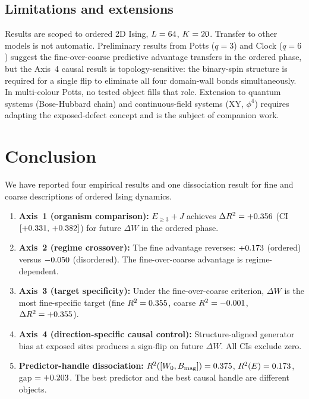 \documentclass[11pt,a4paper]{article}
\begin{document}
\subsection{Limitations and extensions}

Results are scoped to ordered 2D Ising, $L=64$, $K=20$.
Transfer to other models is not automatic.
Preliminary results from Potts ($q=3$) and Clock ($q=6$) suggest the
fine-over-coarse predictive advantage transfers in the ordered phase, but
the Axis~4 causal result is topology-sensitive: the binary-spin structure is required for
a single flip to eliminate all four domain-wall bonds simultaneously.
In multi-colour Potts, no tested object fills that role.
Extension to quantum systems (Bose-Hubbard chain) and continuous-field
systems (XY, $\phi^4$) requires adapting the exposed-defect concept and
is the subject of companion work.

\section{Conclusion}
\label{sec:conclusion}

We have reported four empirical results and one dissociation result
for fine and coarse descriptions of ordered Ising dynamics.

\begin{enumerate}
\item \textbf{Axis~1 (organism comparison):}
$E_{\geq 3}+J$ achieves $\Delta R^2 = +0.356$
(CI $[+0.331,\,+0.382]$) for future $\Delta W$ in the
ordered phase.

\item \textbf{Axis~2 (regime crossover):}
The fine advantage reverses: $+0.173$ (ordered) versus
$-0.050$ (disordered).
The fine-over-coarse advantage is regime-dependent.

\item \textbf{Axis~3 (target specificity):}
Under the fine-over-coarse criterion, $\Delta W$ is the most
fine-specific target
(fine $R^2 = 0.355$, coarse $R^2 = -0.001$,
$\Delta R^2 = +0.355$).

\item \textbf{Axis~4 (direction-specific causal control):}
Structure-aligned generator bias at exposed sites produces a \AxisBSignFlips{}
sign-flip on future $\Delta W$.
All CIs exclude zero.

\item \textbf{Predictor-handle dissociation:}
$R^2([W_0, B_\mathrm{mag}]) = 0.375$,
$R^2(E) = 0.173$,
gap $= +0.203$.
The best predictor and the best causal handle are different objects.
\end{enumerate}
\end{document}
